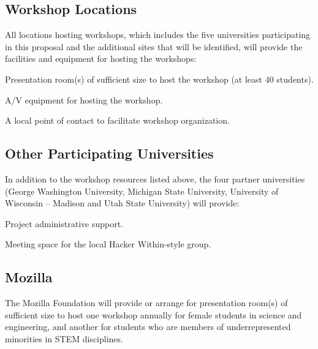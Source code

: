\documentclass{proposalnsf}
\newlength{\up}
\begin{document}
\subsection*{Workshop Locations}

All locations hosting workshops, which includes the five universities
participating in this proposal and the additional sites that will be
identified, will provide the facilities and equipment for hosting the
workshops:

\begin{compactitem}

\item
  Presentation room(s) of sufficient size to host the workshop (at
  least 40 students).

\item
  A/V equipment for hosting the workshop.

\item
  A local point of contact to facilitate workshop organization.

\end{compactitem}

\subsection*{Other Participating Universities}

In addition to the workshop resources listed above, the four partner
universities (George Washington University, Michigan State University,
University of Wisconsin -- Madison and Utah State University) will
provide:

\begin{compactitem}

\item
  Project administrative support.

\item
  Meeting space for the local Hacker Within-style group.

\end{compactitem}

\subsection*{Mozilla}

The Mozilla Foundation will provide or arrange for presentation room(s)
of sufficient size to host one workshop annually for female students in
science and engineering, and another for students who are members of
underrepresented minorities in STEM disciplines.
\end{document}
